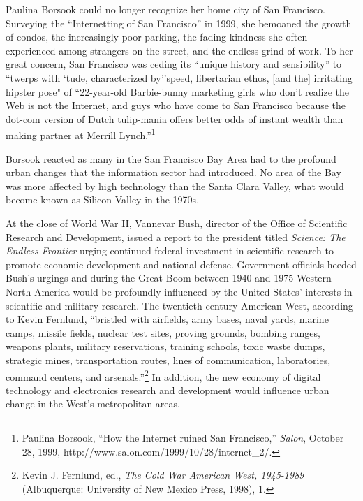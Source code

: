 \documentclass[11pt,article,oneside]{memoir}
\begin{document}
Paulina Borsook could no longer recognize her home city of San
Francisco. Surveying the ``Internetting of San Francisco'' in 1999, she
bemoaned the growth of condos, the increasingly poor parking, the fading
kindness she often experienced among strangers on the street, and the
endless grind of work. To her great concern, San Francisco was ceding
its ``unique history and sensibility'' to ``twerps with `tude,
characterized by''speed, libertarian ethos, {[}and the{]} irritating
hipster pose" of ``22-year-old Barbie-bunny marketing girls who don't
realize the Web is not the Internet, and guys who have come to San
Francisco because the dot-com version of Dutch tulip-mania offers better
odds of instant wealth than making partner at Merrill Lynch.''\footnote{Paulina
  Borsook, ``How the Internet ruined San Francisco,'' \emph{Salon},
  October 28, 1999, http://www.salon.com/1999/10/28/internet\_2/.}

Borsook reacted as many in the San Francisco Bay Area had to the
profound urban changes that the information sector had introduced. No
area of the Bay was more affected by high technology than the Santa
Clara Valley, what would become known as Silicon Valley in the 1970s.

At the close of World War II, Vannevar Bush, director of the Office of
Scientific Research and Development, issued a report to the president
titled \emph{Science: The Endless Frontier} urging continued federal
investment in scientific research to promote economic development and
national defense. Government officials heeded Bush's urgings and during
the Great Boom between 1940 and 1975 Western North America would be
profoundly influenced by the United States' interests in scientific and
military research. The twentieth-century American West, according to
Kevin Fernlund, ``bristled with airfields, army bases, naval yards,
marine camps, missile fields, nuclear test sites, proving grounds,
bombing ranges, weapons plants, military reservations, training schools,
toxic waste dumps, strategic mines, transportation routes, lines of
communication, laboratories, command centers, and arsenals.''\footnote{Kevin
  J. Fernlund, ed., \emph{The Cold War American West, 1945-1989}
  (Albuquerque: University of New Mexico Press, 1998), 1.} In addition,
the new economy of digital technology and electronics research and
development would influence urban change in the West's metropolitan
areas.
\end{document}
